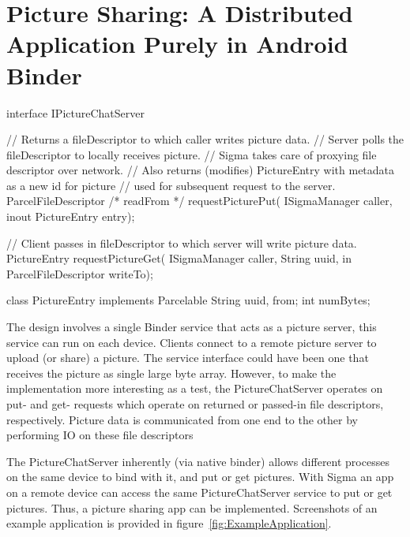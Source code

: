 \documentclass[prodmode]{acmlarge}
\begin{document}
\section{Picture Sharing: A Distributed Application Purely in Android Binder}

\begin{snippet}
interface IPictureChatServer {
  // Returns a fileDescriptor to which caller writes picture data.
  // Server polls the fileDescriptor to locally receives picture.
  // Sigma takes care of proxying file descriptor over network.
  // Also returns (modifies) PictureEntry with metadata as a new id for picture
  // used for subsequent request to the server.
  ParcelFileDescriptor /* readFrom */ requestPicturePut(
    ISigmaManager caller, inout PictureEntry entry);

  // Client passes in fileDescriptor to which server will write picture data.
  PictureEntry requestPictureGet(
    ISigmaManager caller, String uuid, in ParcelFileDescriptor writeTo);
}

class PictureEntry implements Parcelable {
    String uuid, from;
    int numBytes;
}
\end{snippet}

The design involves a single Binder service that acts as a picture server, this service can run on each device. Clients connect to a remote picture server to upload (or share) a picture. The service interface could have been one that receives the picture as single large byte array. However, to make the implementation more interesting as a test, the PictureChatServer operates on put- and get- requests which operate on returned or passed-in file descriptors, respectively. Picture data is communicated from one end to the other by performing IO on these file descriptors

The PictureChatServer inherently (via native binder) allows different processes on the same device to bind with it, and put or get pictures. With Sigma an app on a remote device can access the same PictureChatServer service to put or get pictures. Thus, a picture sharing app can be implemented. Screenshots of an example application is provided in figure~\ref{fig:ExampleApplication}.
\end{document}
